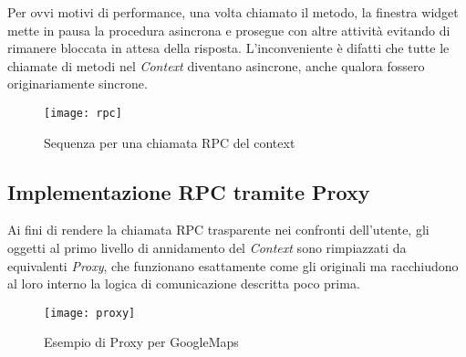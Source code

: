 Per ovvi motivi di performance, una volta chiamato il metodo, la finestra widget mette in pausa la procedura asincrona e prosegue con altre attività evitando di rimanere bloccata in attesa della risposta. L'inconveniente è difatti che tutte le chiamate di metodi nel \textit{Context} diventano asincrone, anche qualora fossero originariamente sincrone.

\begin{figure}[H] 
  \centering 
  \texttt{[image: rpc]} 
  \caption{Sequenza per una chiamata RPC del context}
\end{figure}


\subsection{Implementazione RPC tramite Proxy}

Ai fini di rendere la chiamata RPC trasparente nei confronti dell'utente, gli oggetti al primo livello di annidamento del \textit{Context} sono rimpiazzati da equivalenti \textit{Proxy}, che funzionano esattamente come gli originali ma racchiudono al loro interno la logica di comunicazione descritta poco prima.

\begin{figure}[H] 
  \centering 
  \texttt{[image: proxy]} 
  \caption{Esempio di Proxy per GoogleMaps}
\end{figure}
